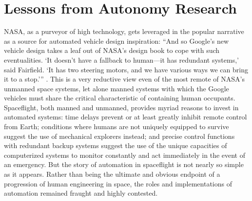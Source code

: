


\section{Lessons from Autonomy Research}


NASA, as a purveyor of high technology,
gets leveraged in the popular narrative as a source for
  automated vehicle design inspiration: ``And so Google's new vehicle
  design 
takes a leaf out of NASA's design book to cope with such
eventualities. `It doesn't have a fallback to human---it has redundant
systems,' said Fairfield. `It has two steering motors, and we have
various ways we can bring it to a stop.''' \cite{simonite}. This is a
very reductive view even of the most remote of NASA's unmanned space
systems, let alone manned systems with which the Google vehicles must share
the critical characteristic of containing human occupants.
Spaceflight, both manned and unmanned, provides myriad reasons to
invest in automated systems: time delays prevent or at least greatly
inhibit remote control from Earth; conditions where humans are not
uniquely equipped to survive suggest the use of mechanical explorers
instead; and precise control functions with redundant backup systems
suggest the use of the unique capacities of computerized systems to
monitor constantly and act immediately in the event of an emergency.
 But the story of automation in spaceflight is
not nearly so simple as it appears. Rather than being the ultimate and
obvious endpoint of a progression of human engineering in space, the
roles and implementations of automation remained fraught and highly
contested. 

